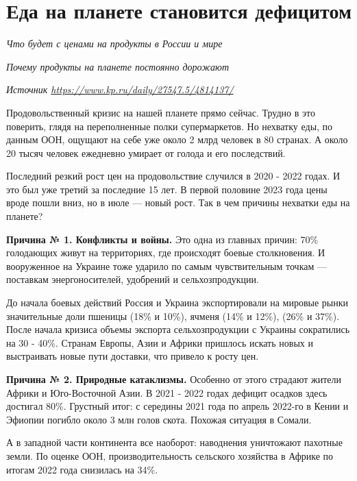\newpage
\section{Еда на планете становится дефицитом}

\textit{Что будет с ценами на продукты в России и мире}

\textit{Почему продукты на планете постоянно дорожают}

\textit{Источник \url{https://www.kp.ru/daily/27547.5/4814137/}}

Продовольственный кризис  на нашей планете прямо сейчас. Трудно в это поверить, глядя на переполненные полки супермаркетов. Но нехватку еды, по данным ООН, ощущают на себе уже около 2 млрд человек в 80 странах. А около 20 тысяч человек ежедневно умирает от голода и его последствий.

Последний резкий рост цен на продовольствие случился в 2020 - 2022 годах. И это был уже третий  за последние 15 лет. В первой половине 2023 года цены вроде пошли вниз, но в июле --- новый рост. Так в чем причины нехватки еды на планете?

\textbf{Причина № 1. Конфликты и войны.} Это одна из главных причин: 70\% голодающих живут на территориях, где происходят боевые столкновения. И  вооруженное  на Украине тоже ударило по самым чувствительным точкам --- поставкам энергоносителей, удобрений и сельхозпродукции.

До начала боевых действий Россия и Украина экспортировали на мировые рынки значительные доли пшеницы (18\% и 10\%), ячменя (14\% и 12\%),  (26\% и 37\%). После начала кризиса объемы экспорта сельхозпродукции с Украины сократились на 30 - 40\%. Странам Европы, Азии и Африки пришлось искать новых  и выстраивать новые пути доставки, что привело к росту цен.

\textbf{Причина № 2. Природные катаклизмы.} Особенно от этого страдают жители Африки и Юго-Восточной Азии. В 2021 - 2022 годах дефицит осадков здесь достигал 80\%. Грустный итог: с середины 2021 года по апрель 2022-го в Кении и Эфиопии погибло около 3 млн голов скота. Похожая ситуация в Сомали.

А в западной части континента все наоборот: наводнения уничтожают пахотные земли. По оценке ООН, производительность сельского хозяйства в Африке по итогам 2022 года снизилась на 34\%.

